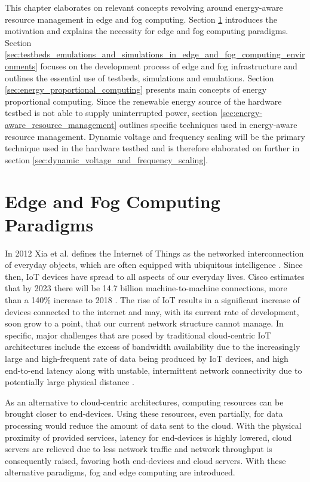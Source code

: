 This chapter elaborates on relevant concepts revolving around energy-aware
resource management in edge and fog computing. Section
\ref{sec:edge_and_fog_computing_paradigms} introduces the motivation and
explains the necessity for edge and fog computing paradigms. Section
\ref{sec:testbeds_emulations_and_simulations_in_edge_and_fog_computing_environments}
focuses on the development process of edge and fog infrastructure and outlines
the essential use of testbeds, simulations and emulations. Section
\ref{sec:energy_proportional_computing} presents main concepts of energy
proportional computing. Since the renewable energy source of the hardware
testbed is not able to supply uninterrupted power, section
\ref{sec:energy-aware_resource_management} outlines specific techniques used in
energy-aware resource management. Dynamic voltage and frequency scaling will be
the primary technique used in the hardware testbed and is therefore elaborated
on further in section \ref{sec:dynamic_voltage_and_frequency_scaling}.

\section{Edge and Fog Computing Paradigms}
\label{sec:edge_and_fog_computing_paradigms}

In 2012 Xia et al. defines the Internet of Things as the networked
interconnection of everyday objects, which are often equipped with ubiquitous
intelligence \cite{xia2012}. Since then, IoT devices have spread to all aspects
of our everyday lives. Cisco estimates that by 2023 there will be 14.7 billion
machine-to-machine connections, more than a 140\% increase to 2018
\cite{cisco2020}. The rise of IoT results in a significant increase of devices
connected to the internet and may, with its current rate of development, soon
grow to a point, that our current network structure cannot manage. In specific,
major challenges that are posed by traditional cloud-centric IoT architectures
include the excess of bandwidth availability due to the increasingly large and
high-frequent rate of data being produced by IoT devices, and high end-to-end
latency along with unstable, intermittent network connectivity due to
potentially large physical distance \cite{buyya2019}.

As an alternative to cloud-centric architectures, computing resources can be
brought closer to end-devices. Using these resources, even partially, for data
processing would reduce the amount of data sent to the cloud. With the physical
proximity of provided services, latency for end-devices is highly lowered, cloud
servers are relieved due to less network traffic and network throughput is
consequently raised, favoring both end-devices and cloud servers. With these
alternative paradigms, fog and edge computing are introduced.

